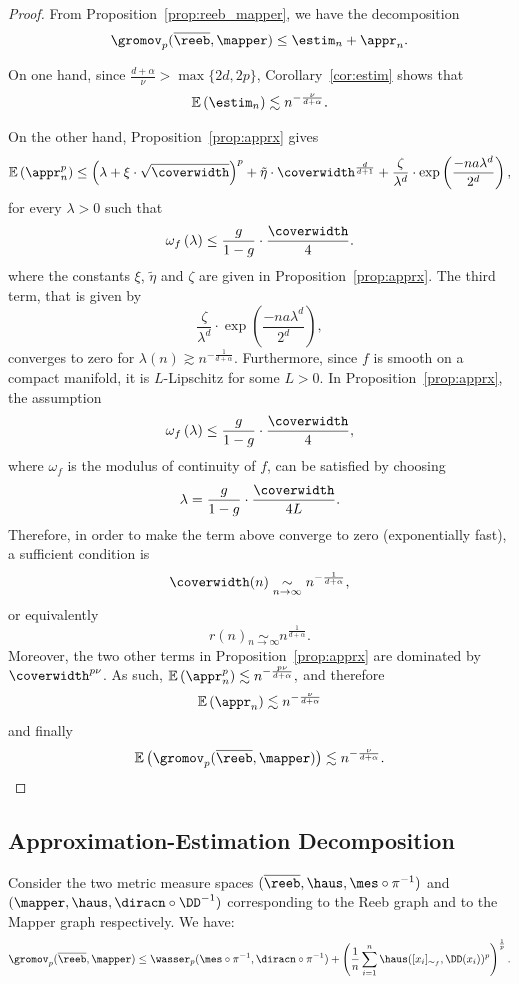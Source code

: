 \begin{proof}
From Proposition~\ref{prop:reeb_mapper}, we have the decomposition
$$\gromov_p(\overline{\reeb},\mapper)\leq \estim_n+\appr_n.$$

On one hand, since $\frac{d+\alpha}{\nu}>\max\{2d,2p\}$, Corollary~\ref{cor:estim} shows that
$$\mathbb{E}\left(\estim_n\right)\lesssim n^{-\frac{\nu}{d+\alpha}}.$$

On the other hand, Proposition~\ref{prop:apprx} gives
$$\mathbb{E}\left(\appr_n^p\right)\leq \left(\lambda+\xi\cdot\sqrt{\coverwidth}\right)^p
    +\tilde{\eta}\cdot\coverwidth^{\frac{d}{d+1}}+\frac{\zeta}{\lambda^d}\cdot\exp\left(\frac{-na\lambda^d}{2^d}\right),$$
    for every $\lambda>0$ such that
$$\omega_f\left(\lambda\right)\leq\frac{g}{1-g}\cdot\frac{\coverwidth}{4}.$$
where the constants $\xi$, $\tilde{\eta}$ and $\zeta$ are given in Proposition~\ref{prop:apprx}. The third term, that is given by 
$$\frac{\zeta}{\lambda^d}\cdot\exp\left(\frac{-na\lambda^d}{2^d}\right),$$
converges to zero for   $\lambda(n) \gtrsim n^{-\frac{1}{d+\alpha}}$.
Furthermore, since $f$ is smooth on a compact manifold, it is $L$-Lipschitz for some $L>0$. 
In Proposition~\ref{prop:apprx}, the assumption
$$\omega_f\left(\lambda\right)\leq\frac{g}{1-g}\cdot\frac{\coverwidth}{4},$$
where $\omega_f$ is the modulus of continuity of $f$, can be satisfied by choosing
$$\lambda=\frac{g}{1-g}\cdot\frac{\coverwidth}{4L}.$$
Therefore, in order to make the term above converge to zero (exponentially fast), a sufficient condition is
$$\coverwidth(n)\underset{n\rightarrow\infty}{\sim} n^{-\frac{1}{d+\alpha}},$$
or equivalently
$$r(n)\underset{n\rightarrow\infty}{\sim} n^{\frac{1}{d+\alpha}}.$$
Moreover, the two other terms in Proposition~\ref{prop:apprx} are dominated by $\coverwidth^{p\nu}$.
As such, 
$\mathbb{E}\left(\appr_n^p\right) \lesssim n^{-\frac{p\nu}{d+\alpha}},$
and therefore
$$\mathbb{E}\left(\appr_n\right)\lesssim n^{-\frac{\nu}{d+\alpha}}$$
and finally
$$\mathbb{E}\left(\gromov_p(\overline{\reeb},\mapper)\right)\lesssim n^{-\frac{\nu}{d+\alpha}}.$$
\end{proof}


\subsection{Approximation-Estimation Decomposition}
\begin{proposition}\label{prop:reeb_mapper}
 Consider the two metric measure spaces $(\overline{\reeb},\haus,\mes\circ\pi^{-1})$ and $(\mapper,\haus,\diracn\circ\DD^{-1})$ corresponding to the Reeb graph and to the Mapper graph respectively. We have:
 $$\gromov_p(\overline{\reeb},\mapper)\leq \wasser_p(\mes\circ\pi^{-1},\diracn\circ\pi^{-1})+\left(\frac{1}{n}\sum_{i=1}^n\haus([x_i]_{\sim_f},\DD(x_i))^p\right)^{\frac{1}{p}}.$$
 \end{proposition}
 
